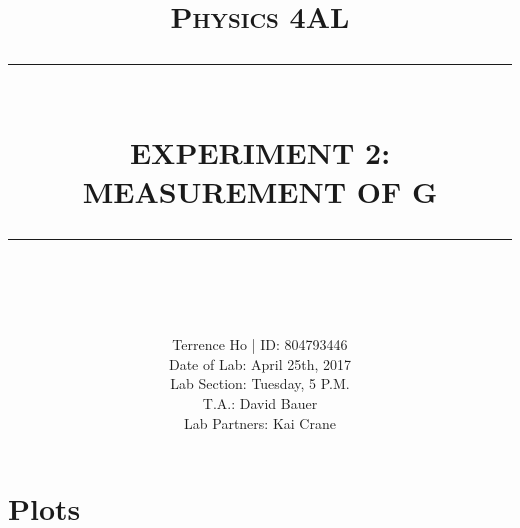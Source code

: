 \documentclass[11pt]{report}
\newcommand{\HRule}[1]{\rule{\linewidth}{#1}}
\begin{document}
\title{ \normalsize \textsc{Physics 4AL}
        \\ [2.0cm]
        \HRule{0.5pt} \\
        \LARGE \textbf{\uppercase{Experiment 2: Measurement of g}}
        \HRule{2pt} \\ [0.5cm]
        \vspace*{2\baselineskip}}

\date{}

\author{
        Terrence Ho | ID: 804793446 \\ 
        Date of Lab: April 25th, 2017 \\
        Lab Section: Tuesday, 5 P.M.\\
        T.A.: David Bauer\\
        Lab Partners: Kai Crane}

\maketitle
\tableofcontents
\newpage

\sectionfont{\scshape}


\section*{Plots}
\datatable

\datatableTwo
\end{document}
